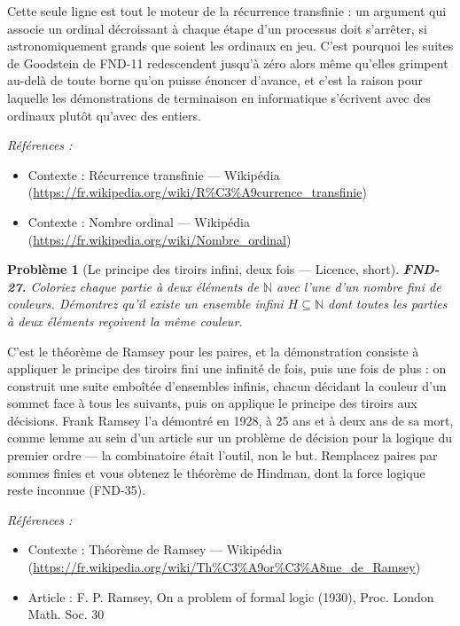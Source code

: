 \documentclass[11pt]{article}
\newtheorem{problem}{Problème}
\newenvironment{refs}{\par\small\noindent\emph{Références :}\begin{itemize}\setlength\itemsep{0pt}}{\end{itemize}\normalsize}
\begin{document}
\noindent Cette seule ligne est tout le moteur de la récurrence transfinie : un argument
qui associe un ordinal décroissant à chaque étape d'un processus doit s'arrêter, si
astronomiquement grands que soient les ordinaux en jeu. C'est pourquoi les suites de Goodstein de
FND-11 redescendent jusqu'à zéro alors même qu'elles grimpent au-delà de toute borne qu'on puisse
énoncer d'avance, et c'est la raison pour laquelle les démonstrations de terminaison en
informatique s'écrivent avec des ordinaux plutôt qu'avec des entiers.

\begin{refs}
\item Contexte : Récurrence transfinie --- Wikipédia (\url{https://fr.wikipedia.org/wiki/R%C3%A9currence_transfinie})
\item Contexte : Nombre ordinal --- Wikipédia (\url{https://fr.wikipedia.org/wiki/Nombre_ordinal})
\end{refs}

\bigskip

\begin{problem}[{Le principe des tiroirs infini, deux fois --- Licence, short}]
\textbf{FND-27.} Coloriez chaque partie à deux éléments de $\mathbb{N}$ avec l'une d'un
nombre fini de couleurs. Démontrez qu'il existe un ensemble infini $ H \subseteq \mathbb{N} $
dont toutes les parties à deux éléments reçoivent la même couleur.
\end{problem}

\noindent C'est le théorème de Ramsey pour les paires, et la démonstration consiste à
appliquer le principe des tiroirs fini une infinité de fois, puis une fois de plus : on construit
une suite emboîtée d'ensembles infinis, chacun décidant la couleur d'un sommet face à tous les
suivants, puis on applique le principe des tiroirs aux décisions. Frank Ramsey l'a démontré en
1928, à 25 ans et à deux ans de sa mort, comme lemme au sein d'un article sur un problème de
décision pour la logique du premier ordre --- la combinatoire était l'outil, non le but. Remplacez
\og{} paires \fg{} par \og{} sommes finies \fg{} et vous obtenez le théorème de Hindman, dont la force logique
reste inconnue (FND-35).

\begin{refs}
\item Contexte : Théorème de Ramsey --- Wikipédia (\url{https://fr.wikipedia.org/wiki/Th%C3%A9or%C3%A8me_de_Ramsey})
\item Article : F. P. Ramsey, \og{} On a problem of formal logic \fg{} (1930), Proc. London Math. Soc. 30
\end{refs}
\end{document}
